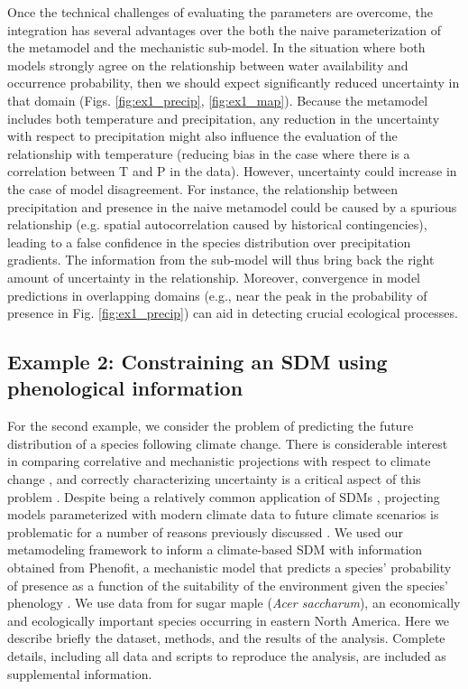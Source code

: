 \documentclass[11pt]{article}
\begin{document}
Once the technical challenges of evaluating the parameters are overcome, the integration has several advantages over the both the naive parameterization of the metamodel and the mechanistic sub-model. 
In the situation where both models strongly agree on the relationship between water availability and occurrence probability, then we should expect significantly reduced uncertainty in that domain (Figs. \ref{fig:ex1_precip}, \ref{fig:ex1_map}).
Because the metamodel includes both temperature and precipitation, any reduction in the uncertainty with respect to precipitation might also influence the evaluation of the relationship with temperature (reducing bias in the case where there is a correlation between T and P in the data). 
However, uncertainty could increase in the case of model disagreement.
For instance, the relationship between precipitation and presence in the naive metamodel could be caused by a spurious relationship (e.g. spatial autocorrelation caused by historical contingencies), leading to a false confidence in the species distribution over precipitation gradients. 
The information from the sub-model will thus bring back the right amount of uncertainty in the relationship.
Moreover, convergence in model predictions in overlapping domains (e.g., near the peak in the probability of presence in Fig. \ref{fig:ex1_precip}) can aid in detecting crucial ecological processes.



%
%


\subsection*{Example 2: Constraining an SDM using phenological information}
For the second example, we consider the problem of predicting the future distribution of a species following climate change.
There is considerable interest in comparing correlative and mechanistic projections with respect to climate change \citep{Morin2009}, and correctly characterizing uncertainty is a critical aspect of this problem \citep{Cheaib2012}.
Despite being a relatively common application of \ac{SDM}s \citep{Guisan2005}, projecting models parameterized with modern climate data to future climate scenarios is problematic for a number of reasons previously discussed \citep{Araujo2006}.
We used our metamodeling framework to inform a climate-based SDM with information obtained from Phenofit, a mechanistic model that predicts a species' probability of presence as a function of the suitability of the environment given the species' phenology \citep{Chuine2001, Morin2009}.
We use data from \citet{Morin2009} for sugar maple (\emph{Acer saccharum}), an economically and ecologically important species occurring in eastern North America.
Here we describe briefly the dataset, methods, and the results of the analysis.
Complete details, including all data and scripts to reproduce the analysis, are included as supplemental information.
\end{document}
